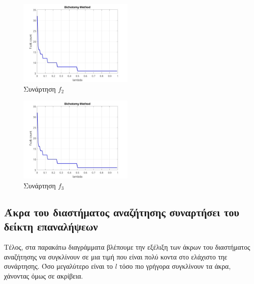 \begin{figure}[H] %
    \centering
    \includegraphics[width=0.5\textwidth]{media/dichotomyf2_2} %
    \caption{Συνάρτηση $f_2$}
\end{figure}

\begin{figure}[H] %
    \centering
    \includegraphics[width=0.5\textwidth]{media/dichotomyf3_2} %
    \caption{Συνάρτηση $f_3$}
\end{figure}

\subsection{Άκρα του διαστήματος αναζήτησης συναρτήσει του δείκτη επαναλήψεων}
Τέλος, στα παρακάτω διαγράμματα βλέπουμε την εξέλιξη των άκρων του διαστήματος αναζήτησης να συγκλίνουν σε
μια τιμή που είναι πολύ κοντα στο ελάχιστο τηε συνάρτησης. Όσο μεγαλύτερο είναι το $l$ τόσο πιο γρήγορα
συγκλίνουν τα άκρα, χάνοντας όμως σε ακρίβεια.

